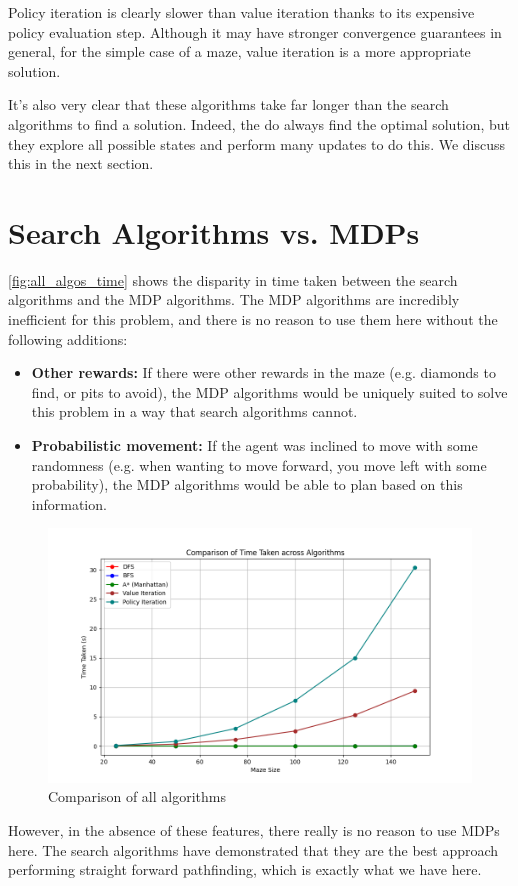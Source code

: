 \documentclass{article}
\begin{document}
Policy iteration is clearly slower than value iteration thanks to its expensive policy evaluation step. Although it may have stronger convergence guarantees in general, for the simple case of a maze, value iteration is a more appropriate solution.

It's also very clear that these algorithms take far longer than the search algorithms to find a solution. Indeed, the do always find the optimal solution, but they explore all possible states and perform many updates to do this. We discuss this in the next section.

\section{Search Algorithms vs. MDPs}

\autoref{fig:all_algos_time} shows the disparity in time taken between the search algorithms and the MDP algorithms. The MDP algorithms are incredibly inefficient for this problem, and there is no reason to use them here without the following additions:

\begin{itemize}
    \item \textbf{Other rewards:} If there were other rewards in the maze (e.g. diamonds to find, or pits to avoid), the MDP algorithms would be uniquely suited to solve this problem in a way that search algorithms cannot.
    \item \textbf{Probabilistic movement:} If the agent was inclined to move with some randomness (e.g. when wanting to move forward, you move left with some probability), the MDP algorithms would be able to plan based on this information.
\end{itemize}

\begin{figure}[h]
    \centering
    \includegraphics[width=\textwidth]{all algos time.png}
    \caption{Comparison of all algorithms}
    \label{fig:all_algos_time}
\end{figure}

However, in the absence of these features, there really is no reason to use MDPs here. The search algorithms have demonstrated that they are the best approach performing straight forward pathfinding, which is exactly what we have here.
\end{document}
